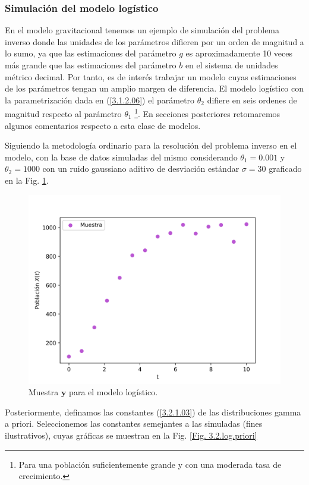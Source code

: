 \subsubsection{Simulación del modelo logístico}

En el modelo gravitacional tenemos un ejemplo de simulación del problema inverso donde las unidades de los parámetros difieren por un orden de magnitud a lo sumo, ya que las estimaciones del parámetro $g$ es aproximadamente 10 veces más grande que las estimaciones del parámetro $b$ en el sistema de unidades métrico decimal. Por tanto, es de interés trabajar un modelo cuyas estimaciones de los parámetros tengan un amplio margen de diferencia. El modelo logístico con la parametrización dada en (\ref{3.1.2.06}) el parámetro $\theta_2$ difiere en seis ordenes de magnitud respecto al parámetro $\theta_1$ \footnote{Para una población suficientemente grande y con una moderada tasa de crecimiento.}. En secciones posteriores retomaremos algunos comentarios respecto a esta clase de modelos.

Siguiendo la metodología ordinario para la resolución del problema inverso en el modelo, con la base de datos simuladas del mismo considerando $\theta_1 = 0.001$ y $\theta_2 = 1000$ con un ruido gaussiano aditivo de desviación estándar $\sigma = 30$ graficado en la Fig. \ref{Fig. 3.2.log.muestra}.

\begin{figure}[H] 
    \centering 
    \includegraphics[width = 10 cm ]{img/Exp_Central_logistico_sigma/Figuras/Generales/Muestra_logistico_sigma.png} 
    \caption{Muestra $\mathbf{y}$ para el modelo logístico.}
    \label{Fig. 3.2.log.muestra}
\end{figure} 

Posteriormente, definamos las constantes (\ref{3.2.1.03}) de las distribuciones gamma a priori. Seleccionemos las constantes semejantes a las simuladas (fines ilustrativos), cuyas gráficas se muestran en la Fig. \ref{Fig. 3.2.log.priori}

